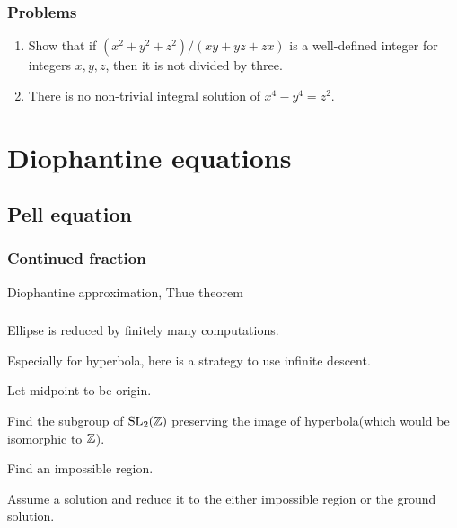 \documentclass{../../large}
\begin{document}
\section*{Problems}

\begin{enumerate}
\item Show that if $(x^2+y^2+z^2)/(xy+yz+zx)$ is a well-defined integer for integers $x,y,z$, then it is not divided by three.
\item There is no non-trivial integral solution of $x^4-y^4=z^2$.
\end{enumerate}











\part{Diophantine equations}
\chapter{Pell equation}
\section{Continued fraction}
Diophantine approximation, Thue theorem

\section{}
Ellipse is reduced by finitely many computations.


Especially for hyperbola, here is a strategy to use infinite descent.
\begin{parts}
\item Let midpoint to be origin.
\item Find the subgroup of $\mathrm{SL}_2(\mathbb{Z})$ preserving the image of hyperbola(which would be isomorphic to $\mathbb{Z}$).
\item Find an impossible region.
\item Assume a solution and reduce it to the either impossible region or the ground solution.
\end{parts}
\end{document}
